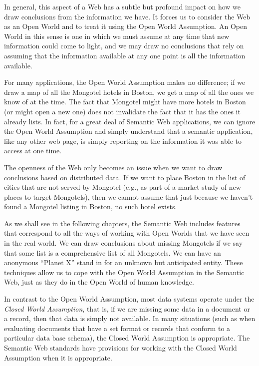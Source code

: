 In general, this aspect of a Web has a subtle but profound impact on how
we draw conclusions from the information we have. It forces us to
consider the Web as an Open World and to treat it using the Open World
Assumption. An Open World in this sense is one in which we must assume
at any time that new information could come to light, and we may draw no
conclusions that rely on assuming that the information available at any
one point is all the information available.

For many applications, the Open World Assumption makes no difference; if
we draw a map of all the Mongotel hotels in Boston, we get a map of all
the ones we know of at the time. The fact that Mongotel might have more
hotels in Boston (or might open a new one) does not invalidate the fact
that it has the ones it already lists. In fact, for a great deal of
Semantic Web applications, we can ignore the Open World Assumption and
simply understand that a semantic application, like any other web page,
is simply reporting on the information it was able to access at one
time.

The openness of the Web only becomes an issue when we want to draw
conclusions based on distributed data. If we want to place Boston in the
list of cities that are not served by Mongotel (e.g., as part of a
market study of new places to target Mongotels), then we cannot assume
that just because we haven't found a Mongotel listing in Boston, no such
hotel exists.

As we shall see in the following chapters, the Semantic Web includes
features that correspond to all the ways of working with Open Worlds
that we have seen in the real world. We can draw conclusions about
missing Mongotels if we say that some list is a comprehensive list of
all Mongotels. We can have an anonymous ``Planet X'' stand in for an
unknown but anticipated entity. These techniques allow us to cope with
the Open World Assumption in the Semantic Web, just as they do in the
Open World of human knowledge.

In contrast to the Open World Assumption, most data systems operate under the
\emph{Closed World Assumption}, that is, if we are missing some data in a document or a record,
then that data is simply not available.  In many situations (such as when evaluating
documents that have a set format or records that conform to a particular data base schema),
the Closed World Assumption is appropriate.   The Semantic Web standards have provisions for
working with the Closed World Assumption when it is appropriate. 


